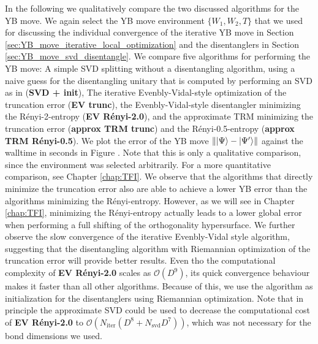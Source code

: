 
In the following we qualitatively compare the two discussed algorithms for the YB move. We again select the YB move environment $\{W_1,W_2, T\}$ that we used for discussing the individual convergence of the iterative YB move in Section \ref{sec:YB_move_iterative_local_optimization} and the disentanglers in Section \ref{sec:YB_move_svd_disentangle}. We compare five algorithms for performing the YB move: A simple SVD splitting without a disentangling algorithm, using a naive guess for the disentangling unitary that is computed by performing an SVD as in \cite{cite:isometric_tensor_network_states_in_two_dimensions, cite:efficient_simulation_of_dynamics_in_two_dimensional_quantum_spin_systems} (\textbf{SVD + init}), The iterative Evenbly-Vidal-style optimization of the truncation error (\textbf{EV trunc}), the Evenbly-Vidal-style disentangler minimizing the Rényi-2-entropy (\textbf{EV Rényi-2.0}), and the approximate TRM minimizing the truncation error (\textbf{approx TRM trunc}) and the Rényi-0.5-entropy (\textbf{approx TRM Rényi-0.5}). We plot the error of the YB move $\lVert\ket{\Psi}-\ket{\Psi^\prime}\rVert$ against the walltime in seconds in Figure . Note that this is only a qualitative comparison, since the environment was selected arbitrarily. For a more quantitative comparison, see Chapter \ref{chap:TFI}. We observe that the algorithms that directly minimize the truncation error also are able to achieve a lower YB error than the algorithms minimizing the Rényi-entropy. However, as we will see in Chapter \ref{chap:TFI}, minimizing the Rényi-entropy actually leads to a lower global error when performing a full shifting of the orthogonality hypersurface. We further observe the slow convergence of the iterative Evenbly-Vidal style algorithm, suggesting that the disentangling algorithm with Riemannian optimization of the truncation error will provide better results. Even tho the computational complexity of \textbf{EV Rényi-2.0} scales as $\mathcal{O}(D^9)$, its quick convergence behaviour makes it faster than all other algorithms. Because of this, we use the algorithm as initialization for the disentanglers using Riemannian optimization. Note that in principle the approximate SVD could be used to decrease the computational cost of \textbf{EV Rényi-2.0} to $\mathcal{O}(N_\text{iter}(D^8 + N_\text{svd} D^7))$, which was not necessary for the bond dimensions we used.